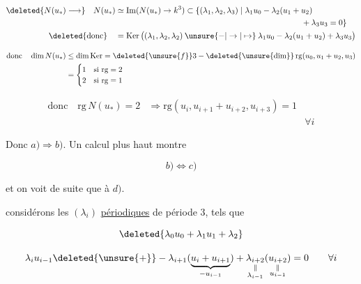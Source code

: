 {\small
\[
\begin{aligned}
\deleted{N(u_*)\longrightarrow}\quad N(u_*)&\simeq\operatorname{Im}(N(u_*)\to k^3)
 \subset\{(\lambda_1,\lambda_2,\lambda_3)\mid\lambda_1u_0-\lambda_2(u_1+u_2)\\
&\hspace{23em}+\lambda_3u_3=0\}\\
\deleted{\text{donc}}\quad &=\operatorname{Ker}\big((\lambda_1,\lambda_2,\lambda_2)\mathbin{\unsure{-|\to|\mapsto}}\lambda_1u_0-\lambda_2(u_1+u_2)+\lambda_3u_3\big)
\end{aligned}
\]
}

\[
\begin{aligned}
\text{donc}\quad\dim N(u_*)&\leq\dim\operatorname{Ker}=\deleted{\unsure{f}}3-
\deleted{\unsure{\dim}}\operatorname{rg}(u_0,u_1+u_2,u_3)\\
&=\begin{cases}1&\text{si }\mathrm{rg}=2\\2&\text{si }\mathrm{rg}=1\end{cases}
\end{aligned}
\]


\[
\begin{aligned}
\text{donc}\quad\mathrm{rg}\,N(u_*)=2&\Rightarrow
 \mathrm{rg}(u_i,u_{i+1}+u_{i+2},u_{i+3})=1\\
&&\forall i
\end{aligned}
\]

Donc $a)\Rightarrow b)$. Un calcul  plus haut montre

\[
b)\Longleftrightarrow c)
\]

et on voit  de suite que   à $d)$.

 considérons les $(\lambda_i)$ \uline{périodiques} de période $3$, tels que

\[
\deleted{\lambda_0u_0+\lambda_1u_1+\lambda_2}
\]

\[
\lambda_i u_{i-1}\deleted{\unsure{+}}-\lambda_{i+1}
(\underbrace{u_i+u_{i+1}}_{-u_{i-1}})+
\underset{\substack{\Vert\\\lambda_{i-1}}}{\lambda_{i+2}}
(\underset{\substack{\Vert\\u_{i-1}}}{u_{i+2}})=0\qquad\forall i
\]

